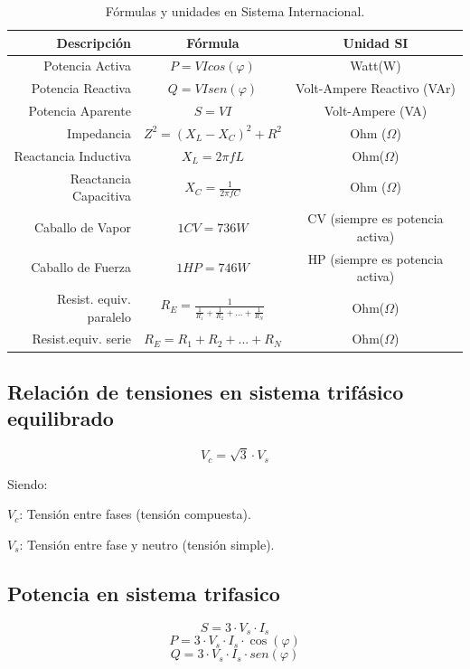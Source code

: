\documentclass[../main]{subfiles}
\begin{document}
\begin{table}[htbp]
  \centering
    \begin{tabular}{|r|c|c|}\hline
      Descripción & Fórmula & Unidad SI\\\hline
      Potencia Activa & $P=V I cos(\varphi)$ & Watt(W)\\
      Potencia Reactiva & $Q=V I sen(\varphi)$ & Volt-Ampere Reactivo (VAr)\\
      Potencia Aparente & $S=V I$ & Volt-Ampere (VA)\\ \hline
      Impedancia &$Z^2=(X_L-X_C)^2+R^2$ & Ohm ($\Omega$)\\
      Reactancia Inductiva & $X_L=2 \pi f L$ & Ohm($\Omega$)\\
      Reactancia Capacitiva & $X_C=\frac{1}{2 \pi f C} $ & Ohm
      ($\Omega$)\\\hline
      Caballo de Vapor & $1CV = 736W$& CV (siempre es potencia activa) \\
      Caballo de Fuerza & $1HP = 746W$& HP (siempre es potencia
      activa) \\ \hline
      Resist. equiv. paralelo & $R_E =
      \frac{1}{\frac{1}{R_1}+\frac{1}{R_2}+...+\frac{1}{R_N}}$&
      Ohm($\Omega$) \\
      Resist.equiv. serie & $R_E = R_1+R_2+...+R_N$&
      Ohm($\Omega$) \\ \hline

    \end{tabular}
    \caption{Fórmulas y unidades en Sistema Internacional.}
\end{table}
\subsection{ Relación de tensiones en sistema trifásico equilibrado}
\begin{equation}
  V_c= \sqrt{3} \cdot V_s
\end{equation}

Siendo:

$V_c$: Tensión entre fases (tensión compuesta).

$V_s$: Tensión entre fase y neutro (tensión simple).

\subsection{Potencia en sistema trifasico}

\begin{equation}
  S= 3 \cdot  V_s \cdot I_s
\end{equation}
\begin{equation}
  P= 3 \cdot  V_s \cdot I_s \cdot \cos(\varphi)
\end{equation}
\begin{equation}
  Q= 3 \cdot  V_s \cdot I_s \cdot sen(\varphi)
\end{equation}
\end{document}
